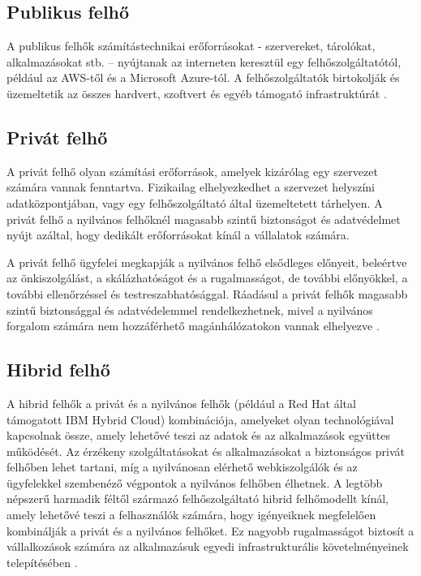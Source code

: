 \subsection{Publikus felhő}
A publikus felhők számítástechnikai erőforrásokat - szervereket, tárolókat, alkalmazásokat stb. -- nyújtanak az interneten keresztül egy felhőszolgáltatótól, például az AWS-től és a Microsoft Azure-tól.
A felhőszolgáltatók birtokolják és üzemeltetik az összes hardvert, szoftvert és egyéb támogató infrastruktúrát \cite{cloudComp}.

\subsection{Privát felhő}
A privát felhő olyan számítási erőforrások, amelyek kizárólag egy szervezet számára vannak fenntartva.
Fizikailag elhelyezkedhet a szervezet helyszíni adatközpontjában, vagy egy felhőszolgáltató által üzemeltetett tárhelyen.
A privát felhő a nyilvános felhőknél magasabb szintű biztonságot és adatvédelmet nyújt azáltal, hogy dedikált erőforrásokat kínál a vállalatok számára.

A privát felhő ügyfelei megkapják a nyilvános felhő elsődleges előnyeit, beleértve az önkiszolgálást, a skálázhatóságot és a rugalmasságot, de további előnyökkel, a további ellenőrzéssel és testreszabhatósággal.
Ráadásul a privát felhők magasabb szintű biztonsággal és adatvédelemmel rendelkezhetnek, mivel a nyilvános forgalom számára nem hozzáférhető magánhálózatokon vannak elhelyezve \cite{cloudComp}.

\subsection{Hibrid felhő}
A hibrid felhők a privát és a nyilvános felhők (például a Red Hat által támogatott IBM Hybrid Cloud) kombinációja, amelyeket olyan technológiával kapcsolnak össze, amely lehetővé teszi az adatok és az alkalmazások együttes működését.
Az érzékeny szolgáltatásokat és alkalmazásokat a biztonságos privát felhőben lehet tartani, míg a nyilvánosan elérhető webkiszolgálók és az ügyfelekkel szembenéző végpontok a nyilvános felhőben élhetnek.
A legtöbb népszerű harmadik féltől származó felhőszolgáltató hibrid felhőmodellt kínál, amely lehetővé teszi a felhasználók számára, hogy igényeiknek megfelelően kombinálják a privát és a nyilvános felhőket.
Ez nagyobb rugalmasságot biztosít a vállalkozások számára az alkalmazásuk egyedi infrastrukturális követelményeinek telepítésében \cite{cloudComp}.

